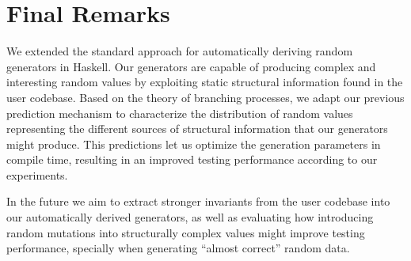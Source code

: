 \section{Final Remarks}

We extended the standard approach for automatically deriving random generators
in Haskell.
%
Our generators are capable of producing complex and interesting random values by
exploiting static structural information found in the user codebase.
%
Based on the theory of branching processes, we adapt our previous prediction
mechanism to characterize the distribution of random values representing the
different sources of structural information that our generators might produce.
%
This predictions let us optimize the generation parameters in compile time,
resulting in an improved testing performance according to our experiments.

In the future we aim to extract stronger invariants from the user codebase into
our automatically derived generators, as well as evaluating how introducing
random mutations into structurally complex values might improve testing
performance, specially when generating ``almost correct'' random data.
